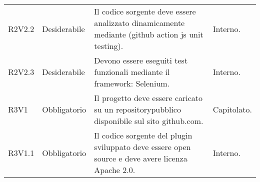 \begin{longtable} {
		>{\centering}p{18mm} 
		>{\centering}p{28mm}
		>{}p{50mm} 
		>{}p{28mm}
		}
	R2V2.2 &
	Desiderabile &
	Il codice sorgente deve essere analizzato dinamicamente mediante (github action js unit testing). &
	Interno.  \TBstrut \\ [2mm]
	
	R2V2.3 &
	Desiderabile &
	Devono essere eseguiti test funzionali mediante il framework: Selenium. &
	Interno.  \TBstrut \\ [2mm]
	
	R3V1 & 
	Obbligatorio & 
	Il progetto deve essere caricato su un repository\glosp pubblico disponibile sul sito github.com. &
	Capitolato.  \TBstrut \\ [2mm]
	
	R3V1.1 & 
	Obbligatorio & 
	Il codice sorgente del plugin sviluppato deve essere open source e deve avere licenza Apache 2.0\glo .  &
	Interno.  \TBstrut \\ [2mm]
\end{longtable}
